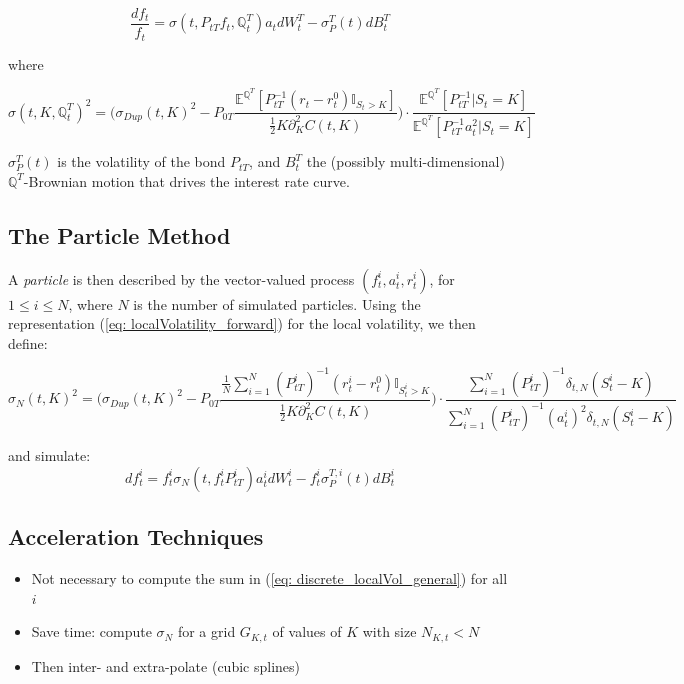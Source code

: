 \begin{equation}\label{eq: forwardPrice}
\frac{df_t}{f_t}= \sigma(t,P_{tT}f_t,\mathbb{Q}_t^T)a_t dW_t^T -\sigma_P^T(t)dB^T_t
\end{equation} 

where 

\begin{equation}\label{eq: localVolatility_forward}
\sigma(t,K,\mathbb{Q}_t^T)^2=\bigg( \sigma_{Dup}(t,K)^2-P_{0T} \frac{ \mathbb{E}^{\mathbb{Q}^T}[ P_{tT}^{-1}(r_t-r^0_t)\mathbb{I}_{S_t>K} ]}{ \frac{1}{2}K\partial^2_KC(t,K) } \bigg)\cdot  \frac{\mathbb{E}^{\mathbb{Q}^T}[P_{tT}^{-1} | S_t = K ]}{ \mathbb{E}^{\mathbb{Q}^T}[ P_{tT}^{-1}a_t^2 | S_t = K ] }
\end{equation}

$ \sigma_P^T(t) $ is the volatility of the bond $ P_{tT}$, and $B^T_t$ the (possibly multi-dimensional) $\mathbb{Q}^T$-Brownian motion that drives the interest rate curve.

\subsection{The Particle Method}
A \textit{particle} is then described by the vector-valued process $(f_t^i,a^i_t,r_t^i)$, for $1\leq i \leq N$, where $N$ is the number of simulated particles.
Using the representation (\ref{eq: localVolatility_forward}) for the local volatility, we then define:

\begin{equation}\label{eq: discrete_localVol_general}
\sigma_N(t,K)^2= \bigg( \sigma_{Dup}(t,K)^2 - P_{0T}\frac{\frac{1}{N}\sum_{i=1}^N (P_{tT}^{i})^{-1}(r_t^i-r_t^0)\mathbb{I}_{S_t^i>K} }{\frac{1}{2}K\partial^2_KC(t,K)}\bigg)\cdot\frac{\sum_{i=1}^N (P_{tT}^{i})^{-1} \delta_{t,N}(S_t^i-K)}{\sum_{i=1}^N (P_{tT}^{i})^{-1} (a_t^i)^2\delta_{t,N}(S_t^i-K)}
\end{equation}

and simulate:
\begin{equation}\label{eq: discrete_forwardPrice}
df_t^i = f_t^i\sigma_N(t,f_t^i P_{tT}^i)a_t^idW_t^i-f_t^i\sigma_P^{T,i}(t)dB_t^i
\end{equation}

\subsection{Acceleration Techniques}\label{subsec: acceleration}
\begin{itemize}
\item Not necessary to compute the sum in (\ref{eq: discrete_localVol_general}) for all $i$
\item Save time: compute $\sigma_N$ for a grid $G_{K,t}$ of values of $K$ with size $N_{K,t}<N$
\item Then inter- and extra-polate (cubic splines)
\end{itemize}

